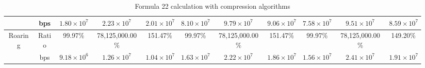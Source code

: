 \begin{table}[h]
{\begin{tabular}{|c|c|c|c|c|c|c|c|c|c|c|}
\cline{2-11}
& bps & $1.80 \times 10^{7}$ & $2.23 \times 10^{7}$ & $2.01 \times 10^{7}$ & $8.10 \times 10^{7}$ & $9.79 \times 10^{7}$ & $9.06 \times 10^{7}$ & $7.58 \times 10^{7}$ & $9.51 \times 10^{7}$ & $8.59 \times 10^{7}$ \\
\hline
\multirow{2}{*}{Roaring} & Ratio & 99.97\% & 78,125,000.00\% & 151.47\% & 99.97\% & 78,125,000.00\% & 151.47\% & 99.97\% & 78,125,000.00\% & 149.20\% \\
\cline{2-11}
& bps & $9.18 \times 10^{6}$ & $1.26 \times 10^{7}$ & $1.04 \times 10^{7}$ & $1.63 \times 10^{7}$ & $2.22 \times 10^{7}$ & $1.86 \times 10^{7}$ & $1.56 \times 10^{7}$ & $2.41 \times 10^{7}$ & $1.91 \times 10^{7}$ \\
\hline
\end{tabular}
}
\caption{Formula 22 calculation with compression algorithms}
\label{tbl:formulacompress22}
\end{table}


